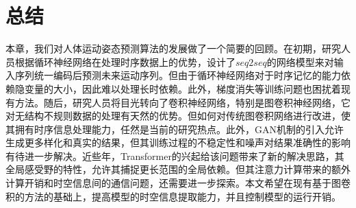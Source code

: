 
\section{总结}
本章，我们对人体运动姿态预测算法的发展做了一个简要的回顾。在初期，研究人员根据循环神经网络在处理时序数据上的优势，设计了$seq2seq$的网络模型来对输入序列统一编码后预测未来运动序列。但由于循环神经网络对于时序记忆的能力依赖隐变量的大小，因此难以处理长时依赖。此外，梯度消失等训练问题也困扰着现有方法。随后，研究人员将目光转向了卷积神经网络，特别是图卷积神经网络，它对无结构不规则数据的处理有天然的优势。但如何对传统图卷积网络进行改进，使其拥有时序信息处理能力，任然是当前的研究热点。此外，GAN机制的引入允许生成更多样化和真实的结果，但其训练过程的不稳定性和噪声对结果准确性的影响有待进一步解决。近些年，Transformer的兴起给该问题带来了新的解决思路，其全局感受野的特性，允许其捕捉更长范围的全局依赖。但其注意力计算带来的额外计算开销和时空信息间的通信问题，还需要进一步探索。本文希望在现有基于图卷积的方法的基础上，提高模型的时空信息提取能力，并且控制模型的运行开销。


